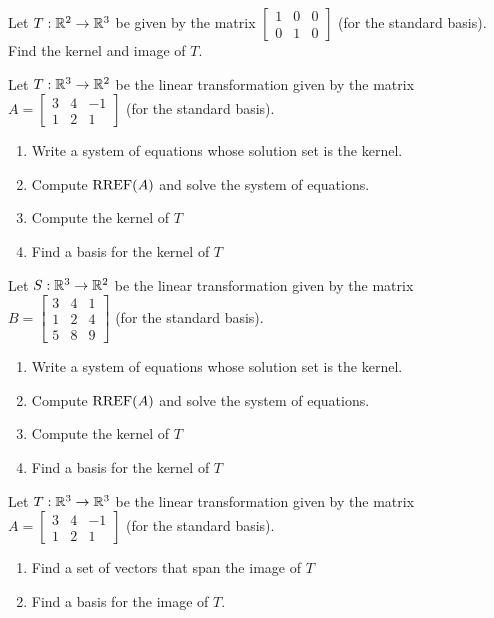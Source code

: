 \begin{applicationActivities}{2}{18}
\begin{activity}{5}
Let $T: \mathbb{R}^2 \rightarrow \mathbb{R}^3$ be given by the matrix $\begin{bmatrix} 1 & 0 &0  \\ 0 & 1 & 0 \end{bmatrix}$ (for the standard basis).  Find the kernel and image of $T$.
\end{activity}



\begin{activity}{10}
Let $T: \mathbb{R}^3 \rightarrow \mathbb{R}^2$ be the linear transformation given by the matrix $A=\begin{bmatrix} 3 & 4 & -1 \\ 1 & 2 & 1 \end{bmatrix}$ (for the standard basis).
\begin{enumerate}[1)]
\item Write a system of equations whose solution set is the kernel.
\item Compute $\operatorname{RREF}(A)$ and solve the system of equations.
\item Compute the kernel of $T$
\item Find a basis for the kernel of $T$
\end{enumerate}
\end{activity}

\begin{activity}{5}
Let $S: \mathbb{R}^3 \rightarrow \mathbb{R}^2$ be the linear transformation given by the matrix $B=\begin{bmatrix} 3 & 4 & 1 \\ 1 & 2 & 4 \\ 5 & 8 & 9 \end{bmatrix}$ (for the standard basis).
\begin{enumerate}[1)]
\item Write a system of equations whose solution set is the kernel.
\item Compute $\operatorname{RREF}(A)$ and solve the system of equations.
\item Compute the kernel of $T$
\item Find a basis for the kernel of $T$
\end{enumerate}
\end{activity}

\begin{activity}{10}
Let $T: \mathbb{R}^3 \rightarrow \mathbb{R}^3$ be the linear transformation given by the matrix $A=\begin{bmatrix} 3 & 4 & -1 \\ 1 & 2 & 1 \end{bmatrix}$ (for the standard basis).
\begin{enumerate}[1)]
\item Find a set of vectors that span the image of $T$
\item Find a basis for the image of $T$.
\end{enumerate}
\end{activity}


\end{applicationActivities}
